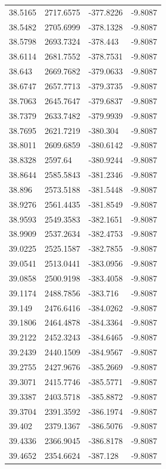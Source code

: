 \begin{table}[H]
\begin{tabular}{llll}
38.5165 & 2717.6575 & -377.8226 & -9.8087 \\
38.5482 & 2705.6999 & -378.1328 & -9.8087 \\
38.5798 & 2693.7324 & -378.443 & -9.8087 \\
38.6114 & 2681.7552 & -378.7531 & -9.8087 \\
38.643 & 2669.7682 & -379.0633 & -9.8087 \\
38.6747 & 2657.7713 & -379.3735 & -9.8087 \\
38.7063 & 2645.7647 & -379.6837 & -9.8087 \\
38.7379 & 2633.7482 & -379.9939 & -9.8087 \\
38.7695 & 2621.7219 & -380.304 & -9.8087 \\
38.8011 & 2609.6859 & -380.6142 & -9.8087 \\
38.8328 & 2597.64 & -380.9244 & -9.8087 \\
38.8644 & 2585.5843 & -381.2346 & -9.8087 \\
38.896 & 2573.5188 & -381.5448 & -9.8087 \\
38.9276 & 2561.4435 & -381.8549 & -9.8087 \\
38.9593 & 2549.3583 & -382.1651 & -9.8087 \\
38.9909 & 2537.2634 & -382.4753 & -9.8087 \\
39.0225 & 2525.1587 & -382.7855 & -9.8087 \\
39.0541 & 2513.0441 & -383.0956 & -9.8087 \\
39.0858 & 2500.9198 & -383.4058 & -9.8087 \\
39.1174 & 2488.7856 & -383.716 & -9.8087 \\
39.149 & 2476.6416 & -384.0262 & -9.8087 \\
39.1806 & 2464.4878 & -384.3364 & -9.8087 \\
39.2122 & 2452.3243 & -384.6465 & -9.8087 \\
39.2439 & 2440.1509 & -384.9567 & -9.8087 \\
39.2755 & 2427.9676 & -385.2669 & -9.8087 \\
39.3071 & 2415.7746 & -385.5771 & -9.8087 \\
39.3387 & 2403.5718 & -385.8872 & -9.8087 \\
39.3704 & 2391.3592 & -386.1974 & -9.8087 \\
39.402 & 2379.1367 & -386.5076 & -9.8087 \\
39.4336 & 2366.9045 & -386.8178 & -9.8087 \\
39.4652 & 2354.6624 & -387.128 & -9.8087 \\

\end{tabular}
\end{table}
